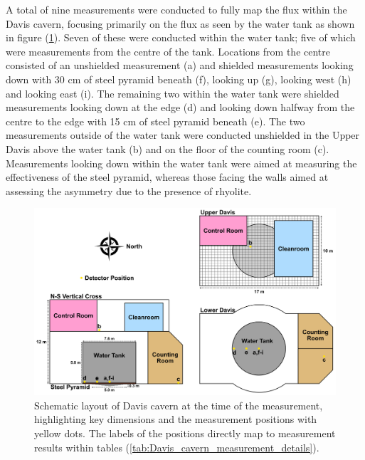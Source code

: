 A total of nine measurements were conducted to fully map the \gray{} flux within the Davis cavern, focusing primarily on the flux as seen by the water tank as shown in figure (\ref{fig:davis_cavern_layout}). Seven of these were conducted within the water tank; five of which were measurements from the centre of the tank. Locations from the centre consisted of an unshielded measurement (a) and shielded measurements looking down with 30 cm of steel pyramid beneath (f), looking up (g), looking west (h) and looking east (i). The remaining two within the water tank were shielded measurements looking down at the edge (d) and looking down halfway from the centre to the edge with 15 cm of steel pyramid beneath (e). The two measurements outside of the water tank were conducted unshielded in the Upper Davis above the water tank (b) and on the floor of the counting room (c). Measurements looking down within the water tank were aimed at measuring the effectiveness of the steel pyramid, whereas those facing the walls aimed at assessing the asymmetry due to the presence of rhyolite.
%
\begin{figure}[]
    \centering
    \includegraphics[scale=0.085]{Chapter_3/Figures/Davis_cavern_diagram.jpg}
    \caption[Schematic layout of Davis cavern at the time of the measurement, highlighting key dimensions and the measurement positions with yellow dots.]
    {Schematic layout of Davis cavern at the time of the measurement, highlighting key dimensions and the measurement positions with yellow dots. The labels of the positions directly map to measurement results within tables (\ref{tab:Davis_cavern_measurement_details}).}
    \label{fig:davis_cavern_layout}
\end{figure}
%
%
